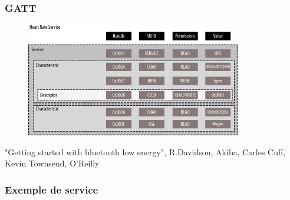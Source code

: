 \begin{frame}
	\frametitle{GATT}
	\begin{figure}
		\includegraphics[height=5cm]{img/gatt.png}
	\end{figure}
{\tiny "Getting started with bluetooth low energy", R.Davidson, Akiba, Carles Cufí, Kevin Townsend, O'Reilly}

\end{frame}

\begin{frame}
	\frametitle{Exemple de service}
\end{frame}
